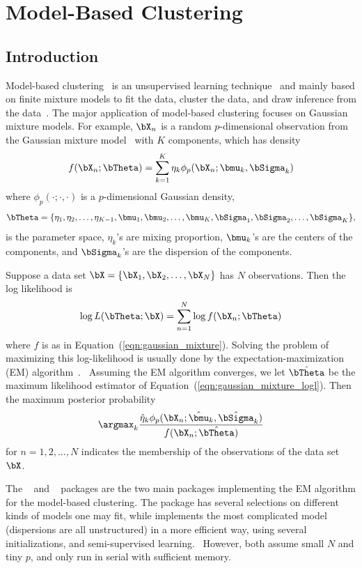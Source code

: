 
\chapter{Model-Based Clustering}
\label{chp:pmclust}

\section{Introduction}

Model-based clustering~
is an unsupervised learning technique~
and mainly based on finite mixture models to fit the data, cluster the data,
and draw inference from the data~\citep{Fraley2002,Melnykov2010}. The major application of
model-based clustering focuses on Gaussian mixture models. For example,
$\bX_n$ is a random $p$-dimensional observation from
the Gaussian mixture model~
with $K$ components, which has density
\begin{equation}
f(\bX_n; \bTheta) = \sum_{k = 1}^K \eta_k \phi_p(\bX_n; \bmu_k, \bSigma_k)
\label{eqn:gaussian_mixture}
\end{equation}
where $\phi_p(\cdot;\cdot,\cdot)$ is a $p$-dimensional Gaussian density,
$$
\bTheta = \{\eta_1, \eta_2, \ldots, \eta_{K-1},
\bmu_1, \bmu_2, \ldots, \bmu_K, \bSigma_1, \bSigma_2, \ldots, \bSigma_K\},
$$
is the parameter space,
$\eta_k$'s are mixing proportion, $\bmu_k$'s are the centers of the components, and
$\bSigma_k$'s are the dispersion of the components.

Suppose a data set $\bX = \{\bX_1, \bX_2, \ldots, \bX_N\}$ has
$N$ observations.  Then the log likelihood is
\begin{equation}
\log L(\bTheta; \bX) = \sum_{n = 1}^N \log f(\bX_n; \bTheta)
\label{eqn:gaussian_mixture_logl}
\end{equation}
where $f$ is as in Equation~(\ref{eqn:gaussian_mixture}).
Solving the problem of maximizing this log-likelihood is usually done by the
expectation-maximization (EM)
algorithm~\citep{Dempster1977}.~
Assuming the EM algorithm converges, we let $\hat{\bTheta}$ be the
maximum likelihood estimator of Equation~(\ref{eqn:gaussian_mixture_logl}).
Then the maximum posterior probability
$$
\argmax_k
\frac{\hat{\eta}_k\phi_p(\bX_n; \hat{\bmu}_k, \hat{\bSigma}_k)
    }{f(\bX_n; \hat{\bTheta})}
$$
for $n = 1, 2, \ldots, N$
indicates the membership of the observations of the data set $\bX$.


The ~\citep{mclust} and
~\citep{Chen2012EMClusterpackage} packages
are the two main  packages implementing the EM algorithm for the
model-based clustering.
The  package has several selections on different kinds of models one may fit, while  
implements the most complicated model (dispersions are all unstructured)
in a more efficient way, using several initializations, and
semi-supervised learning.~
However, both assume small $N$ and tiny $p$, and only run in serial with
sufficient memory.

